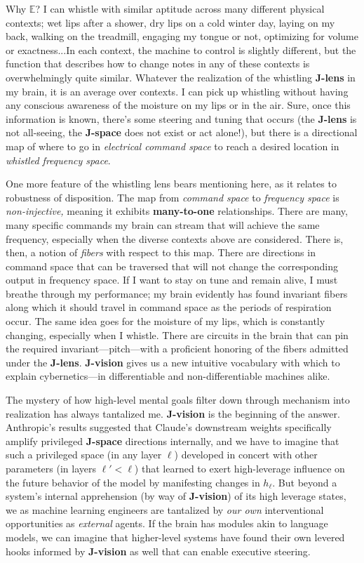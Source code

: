 \documentclass{article}
\begin{document}
Why \(\mathbb{E}\)? I can whistle with similar aptitude across many different physical contexts; wet lips after a shower, dry lips on a cold winter day, laying on my back, walking on the treadmill, engaging my tongue or not, optimizing for volume or exactness...In each context, the machine to control is slightly different, but the function that describes how to change notes in any of these contexts is overwhelmingly quite similar. Whatever the realization of the whistling \textbf{J-lens} in my brain, it is an average over contexts. I can pick up whistling without having any conscious awareness of the moisture on my lips or in the air. Sure, once this information is known, there's some steering and tuning that occurs (the \textbf{J-lens} is not all-seeing, the \textbf{J-space} does not exist or act alone!), but there is a directional map of where to go in \textit{electrical command space} to reach a desired location in \textit{whistled frequency space}. 

One more feature of the whistling lens bears mentioning here, as it relates to robustness of disposition. The map from \textit{command space} to \textit{frequency space} is \textit{non-injective,} meaning it exhibits \textbf{many-to-one} relationships. There are many, many specific commands my brain can stream that will achieve the same frequency, especially when the diverse contexts above are considered. There is, then, a notion of \textit{fibers} with respect to this map. There are directions in command space that can be traversed that will not change the corresponding output in frequency space. If I want to stay on tune and remain alive, I must breathe through my performance; my brain evidently has found invariant fibers along which it should travel in command space as the periods of respiration occur. The same idea goes for the moisture of my lips, which is constantly changing, especially when I whistle. There are circuits in the brain that can pin the required invariant---pitch---with a proficient honoring of the fibers admitted under the \textbf{J-lens}. \textbf{J-vision} gives us a new intuitive vocabulary with which to explain cybernetics---in differentiable and non-differentiable machines alike. 

The mystery of how high-level mental goals filter down through mechanism into realization has always tantalized me. \textbf{J-vision} is the beginning of the answer. Anthropic's results suggested that Claude's downstream weights specifically amplify privileged \textbf{J-space} directions internally, and we have to imagine that such a privileged space (in any layer \(\ell\)) developed in concert with other parameters (in layers \(\ell' < \ell\)) that learned to exert high-leverage influence on the future behavior of the model by manifesting changes in  \(h_\ell\). But beyond a system's internal apprehension (by way of \textbf{J-vision}) of its high leverage states, we as machine learning engineers are tantalized by \textit{our own} interventional opportunities as \textit{external} agents. If the brain has modules akin to language models, we can imagine that higher-level systems have found their own levered hooks informed by \textbf{J-vision} as well that can enable executive steering. 
\end{document}
